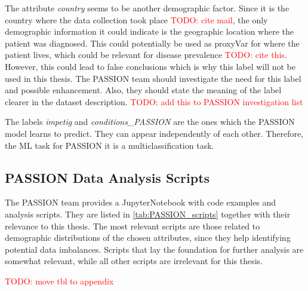 \documentclass[12pt, a4paper, oneside]{book}   	%
\renewcommand{\todo}[1]{\textcolor{red}{TODO: #1}}
\begin{document}
				The attribute \textit{country} seems to be another demographic factor. Since it is the country where the data collection took place \todo{cite mail}, the only demographic information it could indicate is the geographic location where the patient was diagnosed. This could potentially be used as \gls{proxyVar} for where the patient lives, which could be relevant for disease prevalence \todo{cite this}. However, this could lead to false conclusions which is why this label will not be used in this thesis. The PASSION team should investigate the need for this label and possible enhancement. Also, they should state the meaning of the label clearer in the dataset description. \todo{add this to PASSION investigation list}
				
				The labels \textit{impetig} and \textit{conditions\_PASSION} are the ones which the PASSION model learns to predict. They can appear independently of each other. Therefore, the \gls{ML} task for PASSION it is a multiclassification task.
			
			\subsection{PASSION Data Analysis Scripts}
				The PASSION team provides a \gls{JupyterNotebook} with code examples and analysis scripts. They are listed in \autoref{tab:PASSION_scripts} together with their relevance to this thesis. The most relevant scripts are those related to demographic distributions of the chosen attributes, since they help identifying potential data imbalances. Scripts that lay the foundation for further analysis are somewhat relevant, while all other scripts are irrelevant for this thesis.
				
				\todo{move tbl to appendix}
				
\end{document}
